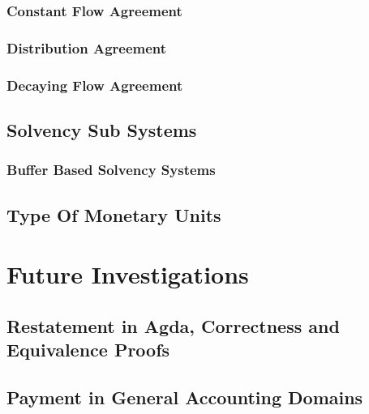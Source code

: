 \subsection{Constant Flow Agreement}

\subsection{Distribution Agreement}

\subsection{Decaying Flow Agreement}

\section{Solvency Sub Systems}

\subsection{Buffer Based Solvency Systems}

\section{Type Of Monetary Units}

\chapter{Future Investigations}

\section{Restatement in Agda, Correctness and Equivalence Proofs}

\section{Payment in General Accounting Domains}

\newpage
\printbibliography{}


